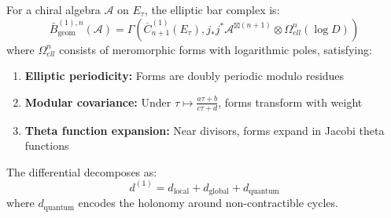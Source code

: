 \begin{theorem}\label{thm:elliptic-bar}
For a chiral algebra $\mathcal{A}$ on $E_\tau$, the elliptic bar complex is:
$$\bar{B}^{(1),n}_{\text{geom}}(\mathcal{A}) = \Gamma\left(\overline{C}_{n+1}^{(1)}(E_\tau), j_*j^*\mathcal{A}^{\boxtimes(n+1)} \otimes \Omega^n_{ell}(\log D)\right)$$
where $\Omega^n_{ell}$ consists of meromorphic forms with logarithmic poles, satisfying:
\begin{enumerate}
\item \textbf{Elliptic periodicity:} Forms are doubly periodic modulo residues
\item \textbf{Modular covariance:} Under $\tau \mapsto \frac{a\tau + b}{c\tau + d}$, forms transform with weight
\item \textbf{Theta function expansion:} Near divisors, forms expand in Jacobi theta functions
\end{enumerate}

The differential decomposes as:
$$d^{(1)} = d_{\text{local}} + d_{\text{global}} + d_{\text{quantum}}$$
where $d_{\text{quantum}}$ encodes the holonomy around non-contractible cycles.
\end{theorem}

